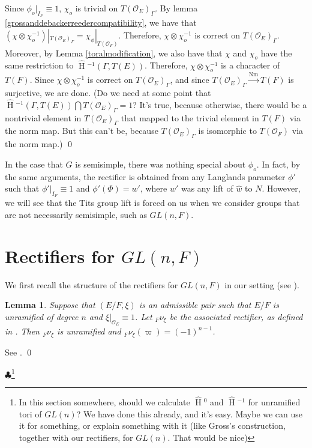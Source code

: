 \documentclass[11pt]{amsart}
\theoremstyle{plain}
\newtheorem{lemma}[theorem]{Lemma}
\newcommand{\MAxxx}[1]{$\clubsuit$\footnote{#1}}
\newcommand{\HT}[1]{\hat{\HH}{}^{#1}}
\theoremstyle{definition}
\DeclareMathOperator{\HH}{H}
\DeclareMathOperator{\Nm}{Nm}
\begin{document}
Since $\phi_o|_{I_F} \equiv 1$, $\chi_o$ is trivial on
$T(\mathcal{O}_E)_{\Gamma}$.  By lemma
\ref{grossanddebackerreedercompatibility}, we have that
$(\chi \otimes \chi_o^{-1})|_{T(\mathcal{O}_E)_{\Gamma}} = \chi_{\phi}|_{T(\mathcal{O}_F)}$.
Therefore, $\chi \otimes \chi_o^{-1}$ is correct on
$T(\mathcal{O}_E)_{\Gamma}$.  Moreover, by Lemma
\ref{toralmodification}, we also have that $\chi$ and $\chi_o$ have
the same restriction to $\HT{-1}(\Gamma, T(E))$.  Therefore,
$\chi \otimes \chi_o^{-1}$ is a character of $T(F)$.  Since
$\chi \otimes \chi_o^{-1}$ is correct on $T(\mathcal{O}_E)_{\Gamma}$, and
since $T(\mathcal{O}_E)_{\Gamma} \xrightarrow{\Nm} T(F)$ is surjective,
we are done.  (Do we need at some point that
$\HT{-1}(\Gamma, T(E)) \bigcap T(\mathcal{O}_E)_{\Gamma} = 1$?
It's true, because otherwise, there would be a nontrivial element in
$T(\mathcal{O}_E)_{\Gamma}$ that mapped to the trivial element in
$T(F)$ via the norm map.  But this can't be, because
$T(\mathcal{O}_E)_{\Gamma}$ is isomorphic to $T(\mathcal{O}_F)$ via
the norm map.)
\qed

In the case that $G$ is semisimple, there was nothing special about
$\phi_o$.  In fact, by the same arguments, the rectifier is obtained
from any Langlands parameter $\phi'$ such that $\phi'|_{I_F} \equiv 1$
and $\phi'(\Phi) = w'$, where $w'$ was any lift of $\hat{w}$ to $N$.
However, we will see that the Tits group lift is forced on us when we
consider groups that are not necessarily semisimple, such as $GL(n,F)$.

\section{Rectifiers for $GL(n,F)$}\label{GL(n)}

We first recall the structure of the rectifiers for $GL(n,F)$ in our
setting (see \cite{bushnellhenniart}).

\begin{lemma}
  Suppose that $(E/F, \xi)$ is an admissible pair such that $E/F$ is
  unramified of degree $n$ and $\xi|_{\mathcal{O}_E} \equiv 1$.  Let
  ${}_F \nu_{\xi}$ be the associated rectifier, as defined in
  \cite{bushnellhenniart}.  Then ${}_F \nu_{\xi}$ is unramified and
  ${}_F \nu_{\xi}(\varpi) = (-1)^{n-1}$.
\end{lemma}

\proof
See \cite[Proposition 21]{bushnellhenniart}.
\qed

\MAxxx{In this section somewhere, should we calculate $\HT{0}$ and
  $\HT{-1}$ for unramified tori of $GL(n)$? We have done this
  already, and it's easy.  Maybe we can use it for something, or
  explain something with it (like Gross's construction, together with
  our rectifiers, for $GL(n)$.  That would be nice)}
\end{document}
